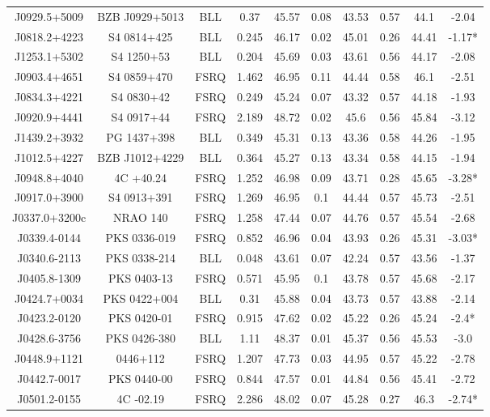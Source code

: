 \documentclass[12pt]{article}
\begin{document}
\begin{landscape}
\begin{longtable}{cccccccccc}
J0929.5+5009 & BZB J0929+5013 & BLL & 0.37 & 45.57 & 0.08 & 43.53 & 0.57 & 44.1 & -2.04 \\
J0818.2+4223 & S4 0814+425 & BLL & 0.245 & 46.17 & 0.02 & 45.01 & 0.26 & 44.41 & -1.17* \\
J1253.1+5302 & S4 1250+53 & BLL & 0.204 & 45.69 & 0.03 & 43.61 & 0.56 & 44.17 & -2.08 \\
J0903.4+4651 & S4 0859+470 & FSRQ & 1.462 & 46.95 & 0.11 & 44.44 & 0.58 & 46.1 & -2.51 \\
J0834.3+4221 & S4 0830+42 & FSRQ & 0.249 & 45.24 & 0.07 & 43.32 & 0.57 & 44.18 & -1.93 \\
J0920.9+4441 & S4 0917+44 & FSRQ & 2.189 & 48.72 & 0.02 & 45.6 & 0.56 & 45.84 & -3.12 \\
J1439.2+3932 & PG 1437+398 & BLL & 0.349 & 45.31 & 0.13 & 43.36 & 0.58 & 44.26 & -1.95 \\
J1012.5+4227 & BZB J1012+4229 & BLL & 0.364 & 45.27 & 0.13 & 43.34 & 0.58 & 44.15 & -1.94 \\
J0948.8+4040 & 4C +40.24 & FSRQ & 1.252 & 46.98 & 0.09 & 43.71 & 0.28 & 45.65 & -3.28* \\
J0917.0+3900 & S4 0913+391 & FSRQ & 1.269 & 46.95 & 0.1 & 44.44 & 0.57 & 45.73 & -2.51 \\
J0337.0+3200c & NRAO 140 & FSRQ & 1.258 & 47.44 & 0.07 & 44.76 & 0.57 & 45.54 & -2.68 \\
J0339.4-0144 & PKS 0336-019 & FSRQ & 0.852 & 46.96 & 0.04 & 43.93 & 0.26 & 45.31 & -3.03* \\
J0340.6-2113 & PKS 0338-214 & BLL & 0.048 & 43.61 & 0.07 & 42.24 & 0.57 & 43.56 & -1.37 \\
J0405.8-1309 & PKS 0403-13 & FSRQ & 0.571 & 45.95 & 0.1 & 43.78 & 0.57 & 45.68 & -2.17 \\
J0424.7+0034 & PKS 0422+004 & BLL & 0.31 & 45.88 & 0.04 & 43.73 & 0.57 & 43.88 & -2.14 \\
J0423.2-0120 & PKS 0420-01 & FSRQ & 0.915 & 47.62 & 0.02 & 45.22 & 0.26 & 45.24 & -2.4* \\
J0428.6-3756 & PKS 0426-380 & BLL & 1.11 & 48.37 & 0.01 & 45.37 & 0.56 & 45.53 & -3.0 \\
J0448.9+1121 & 0446+112 & FSRQ & 1.207 & 47.73 & 0.03 & 44.95 & 0.57 & 45.22 & -2.78 \\
J0442.7-0017 & PKS 0440-00 & FSRQ & 0.844 & 47.57 & 0.01 & 44.84 & 0.56 & 45.41 & -2.72 \\
J0501.2-0155 & 4C -02.19 & FSRQ & 2.286 & 48.02 & 0.07 & 45.28 & 0.27 & 46.3 & -2.74* \\

\end{longtable}
\end{landscape}
\end{document}
